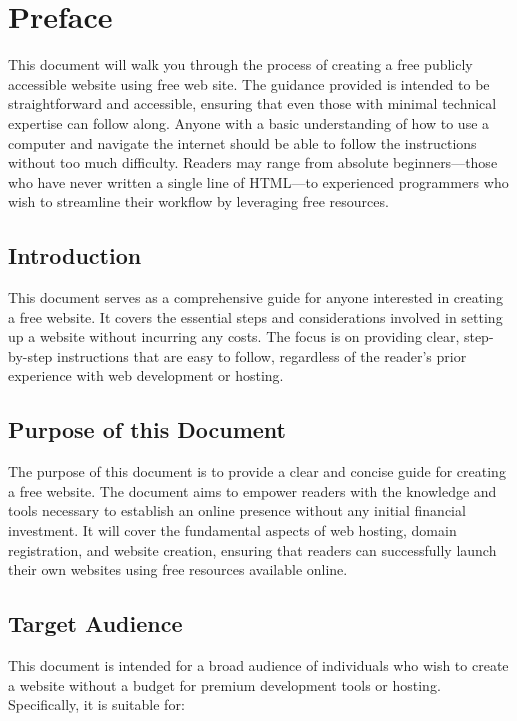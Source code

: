 \section{Preface}

This document will walk you through the process of creating a free publicly accessible website using free web site. The guidance provided is intended to be straightforward and accessible, ensuring that even those with minimal technical expertise can follow along. Anyone with a basic understanding of how to use a computer and navigate the internet should be able to follow the instructions without too much difficulty. Readers may range from absolute beginners—those who have never written a single line of HTML—to experienced programmers who wish to streamline their workflow by leveraging free resources.
\subsection{Introduction}
This document serves as a comprehensive guide for anyone interested in creating a free website. It covers the essential steps and considerations involved in setting up a website without incurring any costs. The focus is on providing clear, step-by-step instructions that are easy to follow, regardless of the reader's prior experience with web development or hosting.
\subsection{Purpose of this Document}

The purpose of this document is to provide a clear and concise guide for creating a free website. The document aims to empower readers with the knowledge and tools necessary to establish an online presence without any initial financial investment. It will cover the fundamental aspects of web hosting, domain registration, and website creation, ensuring that readers can successfully launch their own websites using free resources available online.

\subsection{Target Audience}

This document is intended for a broad audience of individuals who wish to create a website without a budget for premium development tools or hosting. Specifically, it is suitable for:

